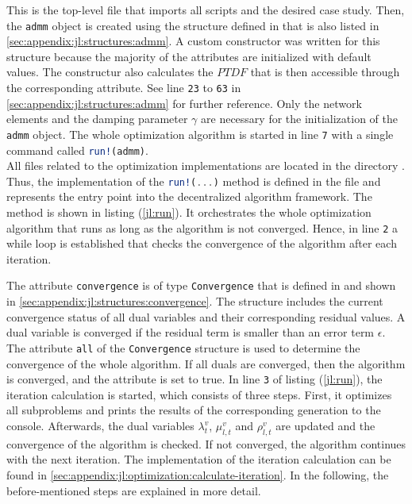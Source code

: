 This is the top-level file that imports all scripts and the desired case study. Then, the \lstinline[language=julia]{admm} object is created using the structure defined in  that is also listed in \ref{sec:appendix:jl:structures:admm}. A custom constructor was written for this structure because the majority of the attributes are initialized with default values. The constructur also calculates the $PTDF$ that is then accessible through the corresponding attribute. See line \texttt{23} to \texttt{63} in \ref{sec:appendix:jl:structures:admm} for further reference. Only the network elements and the damping parameter $\gamma$ are necessary for the initialization of the \lstinline[language=julia]{admm} object. The whole optimization algorithm is started  in line \texttt{7} with a single command called \lstinline[language=julia]{run!(admm)}.\\

All files related to the optimization implementations are located in the directory . Thus, the implementation of the \lstinline[language=julia]{run!(...)} method is defined in the file  and represents the entry point into the decentralized algorithm framework. The method is shown in listing (\ref{jl:run}). It orchestrates the whole optimization algorithm that runs as long as the algorithm is not converged. Hence, in line \texttt{2} a while loop is established that checks the convergence of the algorithm after each iteration.



The attribute \lstinline[language=julia]{convergence} is of type \lstinline[language=julia]{Convergence} that is defined in  and shown in \ref{sec:appendix:jl:structures:convergence}. The structure includes the current convergence status of all dual variables and their corresponding residual values. A dual variable is converged if the residual term is smaller than an error term $\epsilon$. The attribute \lstinline[language=julia]{all} of the \lstinline[language=julia]{Convergence} structure is used to determine the convergence of the whole algorithm. If all duals are converged, then the algorithm is converged, and the attribute is set to true. In line \texttt{3} of listing (\ref{jl:run}), the iteration calculation is started, which consists of three steps. First, it optimizes all subproblems and prints the results of the corresponding generation to the console. Afterwards, the dual variables $\lambda_{t}^v$, $\mu_{l,t}^v$ and $\rho_{l,t}^v$ are updated and the convergence of the algorithm is checked. If not converged, the algorithm continues with the next iteration. The implementation of the iteration calculation can be found in \ref{sec:appendix:jl:optimization:calculate-iteration}. In the following, the before-mentioned steps are explained in more detail.

